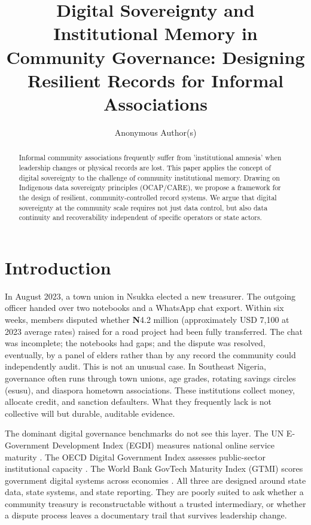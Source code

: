 \documentclass[sigconf,anonymous]{acmart}
\begin{document}
\title{Digital Sovereignty and Institutional Memory in Community Governance: Designing Resilient Records for Informal Associations}

\author{Anonymous Author(s)}

\begin{abstract}
Informal community associations frequently suffer from 'institutional amnesia' when leadership changes or physical records are lost. This paper applies the concept of digital sovereignty to the challenge of community institutional memory. Drawing on Indigenous data sovereignty principles (OCAP/CARE), we propose a framework for the design of resilient, community-controlled record systems. We argue that digital sovereignty at the community scale requires not just data control, but also data continuity and recoverability independent of specific operators or state actors.
\end{abstract}



\maketitle

\section{Introduction}

In August 2023, a town union in Nsukka elected a new treasurer. The outgoing officer handed over two notebooks and a WhatsApp chat export. Within six weeks, members disputed whether \textbf{N}4.2 million (approximately USD 7,100 at 2023 average rates) raised for a road project had been fully transferred. The chat was incomplete; the notebooks had gaps; and the dispute was resolved, eventually, by a panel of elders rather than by any record the community could independently audit. This is not an unusual case. In Southeast Nigeria, governance often runs through town unions, age grades, rotating savings circles (esusu), and diaspora hometown associations. These institutions collect money, allocate credit, and sanction defaulters. What they frequently lack is not collective will but durable, auditable evidence.

The dominant digital governance benchmarks do not see this layer. The UN E-Government Development Index (EGDI) measures national online service maturity \cite{un2022}. The OECD Digital Government Index assesses public-sector institutional capacity \cite{oecd2020}. The World Bank GovTech Maturity Index (GTMI) scores government digital systems across economies \cite{wb2021}. All three are designed around state data, state systems, and state reporting. They are poorly suited to ask whether a community treasury is reconstructable without a trusted intermediary, or whether a dispute process leaves a documentary trail that survives leadership change.
\end{document}

